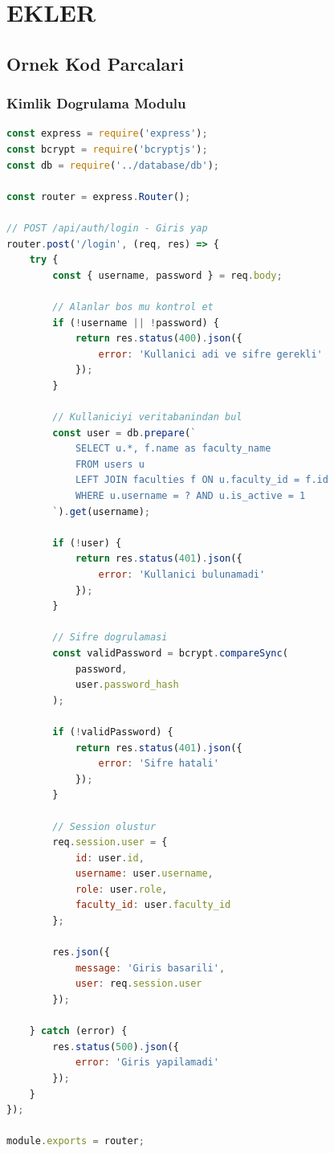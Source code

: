 
\appendix

\chapter{EKLER}
\label{chap:ekler}

\section{Ornek Kod Parcalari}
\label{sec:ornek-kodlar}

\subsection{Kimlik Dogrulama Modulu}
\label{subsec:auth-kod}

\begin{lstlisting}[language=JavaScript, caption={auth.js - Kullanici Giris Islemi}]
const express = require('express');
const bcrypt = require('bcryptjs');
const db = require('../database/db');

const router = express.Router();

// POST /api/auth/login - Giris yap
router.post('/login', (req, res) => {
    try {
        const { username, password } = req.body;

        // Alanlar bos mu kontrol et
        if (!username || !password) {
            return res.status(400).json({ 
                error: 'Kullanici adi ve sifre gerekli' 
            });
        }

        // Kullaniciyi veritabanindan bul
        const user = db.prepare(`
            SELECT u.*, f.name as faculty_name
            FROM users u
            LEFT JOIN faculties f ON u.faculty_id = f.id
            WHERE u.username = ? AND u.is_active = 1
        `).get(username);

        if (!user) {
            return res.status(401).json({ 
                error: 'Kullanici bulunamadi' 
            });
        }

        // Sifre dogrulamasi
        const validPassword = bcrypt.compareSync(
            password, 
            user.password_hash
        );
        
        if (!validPassword) {
            return res.status(401).json({ 
                error: 'Sifre hatali' 
            });
        }

        // Session olustur
        req.session.user = {
            id: user.id,
            username: user.username,
            role: user.role,
            faculty_id: user.faculty_id
        };

        res.json({
            message: 'Giris basarili',
            user: req.session.user
        });

    } catch (error) {
        res.status(500).json({ 
            error: 'Giris yapilamadi' 
        });
    }
});

module.exports = router;
\end{lstlisting}

